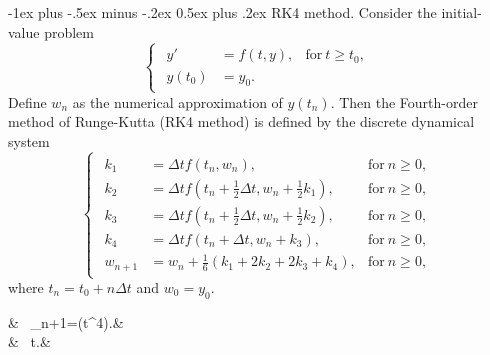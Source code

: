 \documentclass[10pt,landscape,a4paper]{article}
\makeatletter
\renewcommand{\section}{\@startsection{section}{1}{0mm}%
	{-1ex plus -.5ex minus -.2ex}%
	{0.5ex plus .2ex}%
	{\normalfont\large\bfseries}}
\makeatother
\begin{document}
\begin{multicols}{3}
		\section{RK4 method.}
		Consider the initial-value problem
		\[
			\begin{cases}
				\begin{aligned}
					y'&=f(t,y), &\text{for} \ t\geq t_0, \\ y(t_0)&=y_0.&
				\end{aligned}
			\end{cases}
		\]
		Define $ w_n $ as the numerical approximation of $ y(t_n) $. Then the Fourth-order method of Runge-Kutta (RK4 method) is defined by the discrete dynamical system
		\[
			\begin{cases}
				\begin{aligned}
					k_1 &= \Delta tf(t_n,w_n), &\text{for} \ n\geq0,\\
					k_2 &= \Delta tf(t_n + \frac{1}{2}\Delta t, w_n+\frac{1}{2}k_1), &\text{for} \ n\geq0,\\
					k_3 &= \Delta tf(t_n + \frac{1}{2}\Delta t, w_n + \frac{1}{2}k_2), &\text{for} \ n\geq0,\\
					k_4 &= \Delta tf(t_n+\Delta t, w_n+k_3), &\text{for} \ n\geq0,\\
					w_{n+1} &= w_n + \frac{1}{6}(k_1 + 2k_2 + 2k_3 + k_4), &\text{for} \ n\geq0,
				\end{aligned}
			\end{cases}
		\]
		where $ t_n=t_0+n\Delta t $ and $ w_0=y_0 $.
			\begin{flalign*}
				& \ \tau_{n+1}=(\Delta t^4).&\\
				& \ \Delta t\leq{}.&
			\end{flalign*}
		

\end{multicols}
\end{document}
